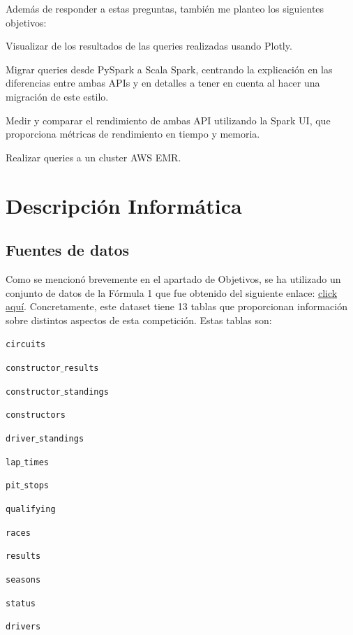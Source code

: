 \documentclass[12pt,twoside,titlepage]{report}
\begin{document}
Además de responder a estas preguntas, también me planteo los siguientes objetivos:

\begin{compactitem}
  \item Visualizar de los resultados de las queries realizadas usando Plotly. 
  \item Migrar queries desde PySpark a Scala Spark, centrando la explicación en las diferencias entre ambas APIs y en detalles a tener en cuenta al hacer una migración de este estilo.
  \item Medir y comparar el rendimiento de ambas API utilizando la Spark UI, que proporciona métricas de rendimiento en tiempo y memoria.
  \item Realizar queries a un cluster AWS EMR.
\end{compactitem}


\chapter{Descripción Informática}
\label{chap:contenidos}
\newpage

\section{Fuentes de datos}

Como se mencionó brevemente en el apartado de Objetivos, se ha utilizado un conjunto de datos de la Fórmula 1 que fue obtenido del siguiente enlace: \href{https://www.kaggle.com/rohanrao/formula-1-world-championship-1950-2020}{click aquí}. Concretamente, este dataset tiene 13 tablas que proporcionan información sobre distintos aspectos de esta competición. Estas tablas son:

\begin{compactitem}
  \item \texttt{circuits}
  \item \texttt{constructor$\_$results}
  \item \texttt{constructor$\_$standings}
  \item \texttt{constructors}
  \item \texttt{driver$\_$standings}
  \item \texttt{lap$\_$times}
  \item \texttt{pit$\_$stops}
  \item \texttt{qualifying}
  \item \texttt{races}
  \item \texttt{results}
  \item \texttt{seasons}
  \item \texttt{status}
  \item \texttt{drivers}
\end{compactitem}
\end{document}

